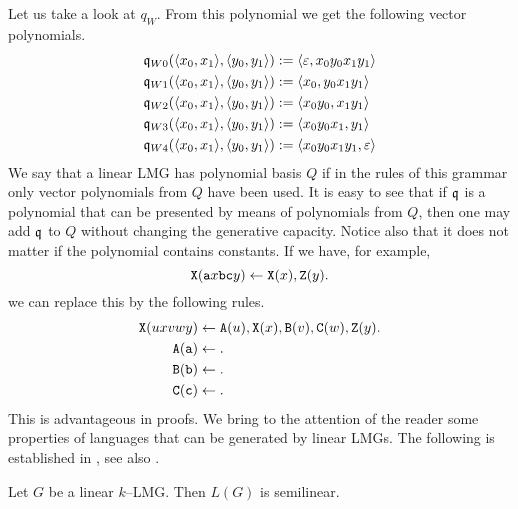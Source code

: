 Let us take a look at $q_W$. From this polynomial we get the
following vector polynomials.
\begin{equation}
\begin{split}
\mathfrak{q}_{W0}(\langle x_0,x_1\rangle,\langle y_0, y_1\rangle) & :=
	\langle \varepsilon, x_0y_0x_1y_1\rangle \\
\mathfrak{q}_{W1}(\langle x_0,x_1\rangle,\langle y_0, y_1\rangle) & :=
	\langle x_0, y_0x_1y_1\rangle \\
\mathfrak{q}_{W2}(\langle x_0,x_1\rangle,\langle y_0, y_1\rangle) & :=
	\langle x_0y_0, x_1 y_1\rangle \\
\mathfrak{q}_{W3}(\langle x_0,x_1\rangle,\langle y_0, y_1\rangle) & :=
	\langle x_0y_0x_1, y_1\rangle \\
\mathfrak{q}_{W4}(\langle x_0,x_1\rangle,\langle y_0, y_1\rangle) & :=
	\langle x_0y_0x_1y_1, \varepsilon \rangle
\end{split}
\end{equation}
We say that a linear LMG has polynomial 
basis $Q$ if in the rules of this grammar only vector polynomials 
from $Q$ have been used. It is easy to see that if $\mathfrak{q}$ is a 
polynomial that can be presented by means of polynomials from $Q$, 
then one may add $\mathfrak{q}$ to $Q$ without changing the generative 
capacity. Notice also that it does not matter if the polynomial 
contains constants.  If we have, for example,
\begin{equation}
\mbox{\tt X}(\mbox{\tt a}x\mbox{\tt bc}y)
    \leftarrow \mbox{\tt X}(x), \mbox{\tt Z}(y).
\end{equation}
we can replace this by the following rules.
\begin{align}
\begin{split}
\mbox{\tt X}(uxvwy) & \leftarrow
    \mbox{\tt A}(u), \mbox{\tt X}(x),
    \mbox{\tt B}(v), \mbox{\tt C}(w),
    \mbox{\tt Z}(y). \\
\mbox{\tt A}(\mbox{\tt a}) & \leftarrow . \\
\mbox{\tt B}(\mbox{\tt b}) & \leftarrow . \\
\mbox{\tt C}(\mbox{\tt c}) & \leftarrow .
\end{split}
\end{align}
This is advantageous in proofs. We bring to the attention of the
reader some properties of languages that can be generated by
linear LMGs. The following is established in 
, see also \cite{weir:phd}.
\begin{prop}
\label{prop:linear-semilinear}
Let $G$ be a linear $k$--LMG. Then $L(G)$ is semilinear.
\end{prop}
